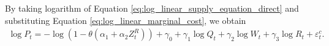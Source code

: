\documentclass[11pt, a4paper]{article}
\begin{document}
By taking logarithm of Equation \eqref{eq:log_linear_supply_equation_direct} and substituting Equation \eqref{eq:log_linear_marginal_cost}, we obtain
\begin{align}
    \log P_t = - \log(1 - \theta(\alpha_1 + \alpha_2 Z^{R}_{t})) + \gamma_0 + \gamma_1 \log Q_t +  \gamma_2 \log W_{t} + \gamma_3 \log R_t + \varepsilon^{c}_{t}. \label{eq:log_linear_supply_equation}
\end{align}


\end{document}
